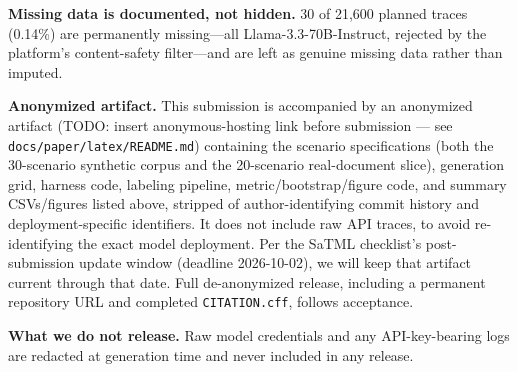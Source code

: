 \textbf{Missing data is documented, not hidden.} 30 of 21,600 planned
traces (0.14\%) are permanently missing---all Llama-3.3-70B-Instruct,
rejected by the platform's content-safety filter---and are left as
genuine missing data rather than imputed.

\textbf{Anonymized artifact.} This submission is accompanied by an
anonymized artifact (TODO: insert anonymous-hosting link before
submission --- see \texttt{docs/paper/latex/README.md}) containing the
scenario specifications (both the 30-scenario synthetic corpus and the
20-scenario real-document slice), generation grid, harness code,
labeling pipeline, metric/bootstrap/figure code, and summary
CSVs/figures listed above, stripped of author-identifying commit
history and deployment-specific identifiers. It does not include raw
API traces,
to avoid re-identifying the exact model deployment. Per the SaTML
checklist's post-submission update window (deadline 2026-10-02), we
will keep that artifact current through that date. Full
de-anonymized release, including a permanent repository URL and
completed \texttt{CITATION.cff}, follows acceptance.

\textbf{What we do not release.} Raw model credentials and any
API-key-bearing logs are redacted at generation time and never included
in any release.

